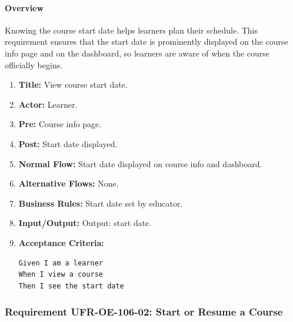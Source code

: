 \paragraph{Overview}
Knowing the course start date helps learners plan their schedule. This requirement ensures that the start date is prominently displayed on the course info page and on the dashboard, so learners are aware of when the course officially begins.
\begin{enumerate}[label=\textbf{\arabic*.}]
\item \textbf{Title:} View course start date.
\item \textbf{Actor:} Learner.
\item \textbf{Pre:} Course info page.
\item \textbf{Post:} Start date displayed.
\item \textbf{Normal Flow:} Start date displayed on course info and dashboard.
\item \textbf{Alternative Flows:} None.
\item \textbf{Business Rules:} Start date set by educator.
\item \textbf{Input/Output:} Output: start date.
\item \textbf{Acceptance Criteria:}
    \begin{verbatim}
Given I am a learner
When I view a course
Then I see the start date
    \end{verbatim}
\end{enumerate}

\subsubsection{Requirement UFR-OE-106-02: Start or Resume a Course}
